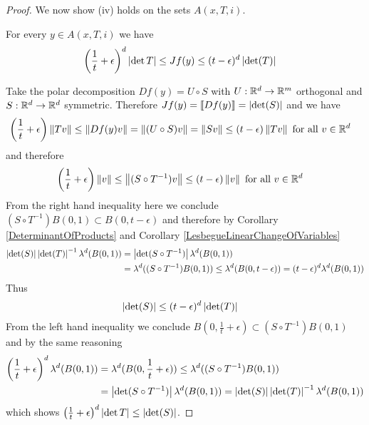 \begin{proof}
We now show (iv) holds on the sets $A(x,T,i)$.
\begin{clm}For every $y \in A(x,T,i)$ we have
\begin{align*}
\left( \frac{1}{t} + \epsilon \right)^d \left \vert \det T \right \vert &\leq Jf(y) \leq (t-\epsilon)^d \left \vert \det(T) \right \vert
\end{align*}
\end{clm}
Take the polar decomposition $Df(y) = U \circ S$ with $U : \mathbb{R}^d \to \mathbb{R}^m$ orthogonal and $S : \mathbb{R}^d \to \mathbb{R}^d$ symmetric.  Therefore $Jf(y) = \llbracket Df(y) \rrbracket = \left \vert \det(S) \right \vert$ and we
have
\begin{align*}
\left( \frac{1}{t} + \epsilon \right) \left \lVert Tv \right \rVert &\leq \left \lVert Df(y) v \right \rVert = \left \lVert (U \circ S) v  \right \rVert =  \left \lVert S v \right \rVert \leq (t-\epsilon)\left \lVert Tv \right \rVert \text{ for all $v \in \mathbb{R}^d$}
\end{align*}
and therefore
\begin{align*}
\left( \frac{1}{t} + \epsilon \right) \left \lVert v \right \rVert &\leq \left \lVert (S \circ T^{-1}) v \right \rVert \leq (t-\epsilon)\left \lVert v \right \rVert \text{ for all $v \in \mathbb{R}^d$}
\end{align*}
From the right hand inequality here we conclude $(S \circ T^{-1}) B(0,1) \subset B(0, t-\epsilon)$ and therefore by Corollary \ref{DeterminantOfProducts} and  Corollary \ref{LesbegueLinearChangeOfVariables}
\begin{align*}
\left \vert \det(S) \right \vert \left \vert \det(T) \right \vert^{-1} \lambda^d(B(0,1)) &= \left \vert \det(S \circ T^{-1}) \right \vert \lambda^d(B(0,1)) \\
&= \lambda^d((S \circ T^{-1}) B(0,1)) \leq \lambda^d(B(0, t-\epsilon)) = (t-\epsilon)^d \lambda^d(B(0,1)) 
\end{align*}
Thus 
\begin{align*}
\left \vert \det(S) \right \vert  &\leq (t-\epsilon)^d \left \vert \det(T) \right \vert
\end{align*}
From the left hand inequality we conclude $B(0, \frac{1}{t} + \epsilon) \subset (S \circ T^{-1}) B(0,1)$ and by the same reasoning
\begin{align*}
\left( \frac{1}{t} + \epsilon \right)^d \lambda^d(B(0,1)) &= \lambda^d(B(0, \frac{1}{t} + \epsilon) ) \leq \lambda^d((S \circ T^{-1}) B(0,1)) \\
&= \left \vert \det(S \circ T^{-1}) \right \vert \lambda^d(B(0,1)) = \left \vert \det(S) \right \vert \left \vert \det(T) \right \vert^{-1} \lambda^d(B(0,1))
\end{align*}
which shows $\left( \frac{1}{t} + \epsilon \right)^d \left \vert \det T \right \vert \leq \left \vert \det(S) \right \vert$.  


\end{proof}
